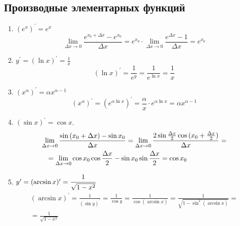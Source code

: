 \documentclass[a4paper, 12pt]{article}
\newcommand\tab[1][.5cm]{\hspace*{#1}}
\theoremstyle{definition}
\begin{document}
    \subsection{Производные элементарных функций}
        \begin{enumerate}
                \item $(e^x)^{\prime}=e^x$
                \[\lim\limits_{\Delta x\to 0}\frac{e^{x_0+\Delta x}-e^{x_0}}{\Delta x}=e^{x_0}\cdot\lim\limits_{\Delta x\to 0}\frac{e^{\Delta x}-1}{\Delta x}=e^{x_0}\]
                \item $y^{\prime}=(\ln{x})^{\prime}=\frac{1}{x}$
                \[(\ln{x})^{\prime}=\frac{1}{e^y}=\frac{1}{e^{\ln{x}}}=\frac{1}{x}\]
                \item $(x^{\alpha})^{\prime}=\alpha x^{\alpha-1}$
                \[(x^{\alpha})^{\prime}=(e^{\alpha\ln{x}})^{\prime}=\frac{\alpha}{x}\cdot e^{\alpha\ln{x}}=\alpha x^{\alpha-1}\]
                \item $(\sin{x})^{\prime}=\cos{x}$.
                \begin{multline*}
                    \lim\limits_{\Delta x\to 0}\frac{\sin{(x_0+\Delta x)-\sin{x_0}}}{\Delta x}=\lim\limits_{\Delta x\to 0}\frac{2\sin{\frac{\Delta x}{2}}\cos{(x_0+\frac{\Delta x}{2})}}{\Delta x}=\\
                    =\lim\limits_{\Delta x\to 0}\cos{x_0}\cos{\frac{\Delta x}{2}}-\sin{x_0}\sin{\frac{\Delta x}{2}}=\cos{x_0}\tab[1.7cm]
                \end{multline*}
                \item $y^{\prime}=(\arcsin{x})^{\prime}=\cfrac{1}{\sqrt{1-x^2}}$
                \begin{multline*}
                    (\arcsin{x})^{\prime}=\frac{1}{(\sin{y})^{\prime}}=\frac{1}{\cos{y}}=\frac{1}{\cos{(\arcsin{x})}}=\frac{1}{\sqrt{1-\sin^2{(\arcsin{x})}}}=\\
                    =\frac{1}{\sqrt{1-x^2}}
                \end{multline*}
        \end{enumerate}
\end{document}
